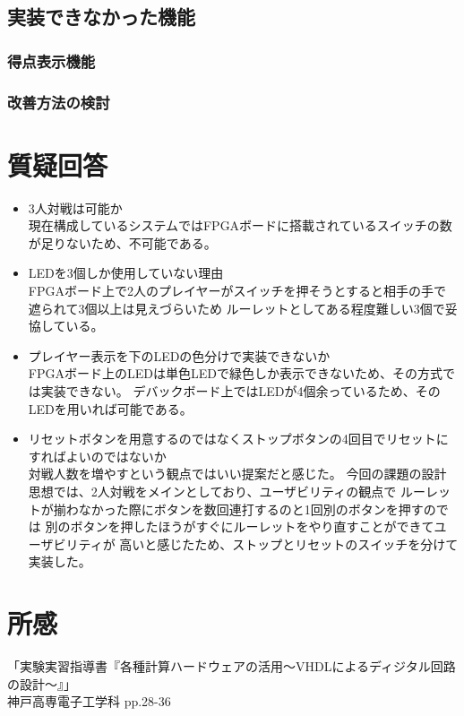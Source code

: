 \documentclass{ltjsarticle}
\begin{document}
	\subsection{実装できなかった機能}
		\subsubsection{得点表示機能}
		\subsubsection{改善方法の検討}
\section{質疑回答}
	\begin{itemize}
		\item 3人対戦は可能か\\
			現在構成しているシステムではFPGAボードに搭載されているスイッチの数が足りないため、不可能である。\\
		\item LEDを3個しか使用していない理由\\
			FPGAボード上で2人のプレイヤーがスイッチを押そうとすると相手の手で遮られて3個以上は見えづらいため
			ルーレットとしてある程度難しい3個で妥協している。\\
		\item プレイヤー表示を下のLEDの色分けで実装できないか\\
			FPGAボード上のLEDは単色LEDで緑色しか表示できないため、その方式では実装できない。
			デバックボード上ではLEDが4個余っているため、そのLEDを用いれば可能である。\\
		\item リセットボタンを用意するのではなくストップボタンの4回目でリセットにすればよいのではないか\\
			対戦人数を増やすという観点ではいい提案だと感じた。
			今回の課題の設計思想では、2人対戦をメインとしており、ユーザビリティの観点で
			ルーレットが揃わなかった際にボタンを数回連打するのと1回別のボタンを押すのでは
			別のボタンを押したほうがすぐにルーレットをやり直すことができてユーザビリティが
			高いと感じたため、ストップとリセットのスイッチを分けて実装した。\\
	\end{itemize}
\section{所感}
\begin{thebibliography}{99}
「実験実習指導書『各種計算ハードウェアの活用〜VHDLによるディジタル回路の設計〜』」\\
神戸高専電子工学科 pp.28-36
\end{thebibliography}
\end{document}
